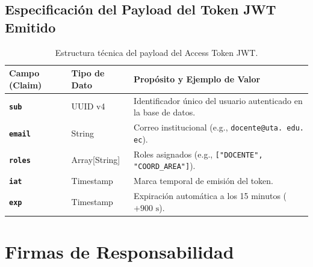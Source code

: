 \documentclass[12pt,a4paper]{article}
\begin{document}
\subsection{Especificación del Payload del Token JWT Emitido}
\begin{table}[H]
\centering
\small
\renewcommand{\arraystretch}{1.2}
\begin{tabularx}{\textwidth}{|>{\hsize=0.8\hsize\raggedright\arraybackslash\bfseries\footnotesize}X|>{\hsize=0.7\hsize\centering\arraybackslash\footnotesize}X|>{\hsize=1.5\hsize\raggedright\arraybackslash\footnotesize}X|}
\hline
\rowcolor{tableheader}
\textbf{Campo (Claim)} & \textbf{Tipo de Dato} & \textbf{Propósito y Ejemplo de Valor} \\
\hline
\texttt{sub} & UUID v4 & Identificador único del usuario autenticado en la base de datos. \\
\hline
\texttt{email} & String & Correo institucional (e.g., \texttt{docente@uta. edu. ec}). \\
\hline
\texttt{roles} & Array[String] & Roles asignados (e.g., \texttt{["DOCENTE", "COORD\_\allowbreak  AREA"]}). \\
\hline
\texttt{iat} & Timestamp & Marca temporal de emisión del token. \\
\hline
\texttt{exp} & Timestamp & Expiración automática a los 15 minutos ($+900\text{ s}$). \\
\hline
\end{tabularx}
\caption{Estructura técnica del payload del Access Token JWT.}
\end{table}

\section{Firmas de Responsabilidad}
\end{document}
